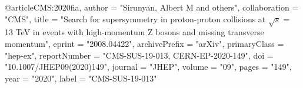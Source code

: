 @article{CMS:2020fia,
    author = "Sirunyan, Albert M and others",
    collaboration = "CMS",
    title = "{Search for supersymmetry in proton-proton collisions at $\sqrt{s} =$ 13 TeV in events with high-momentum Z bosons and missing transverse momentum}",
    eprint = "2008.04422",
    archivePrefix = "arXiv",
    primaryClass = "hep-ex",
    reportNumber = "CMS-SUS-19-013, CERN-EP-2020-149",
    doi = "10.1007/JHEP09(2020)149",
    journal = "JHEP",
    volume = "09",
    pages = "149",
    year = "2020",
    label = "CMS-SUS-19-013"
}

